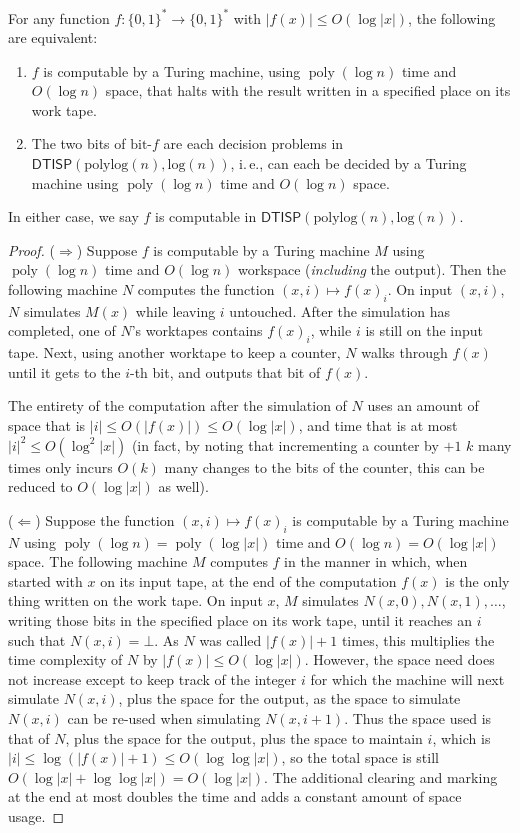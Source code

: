 \documentclass{article}
\DeclareMathOperator{\poly}{poly}
\newcommand*{\ComplexityClass}[1]{\ensuremath{\mathsf{#1}}\xspace}
\newcommand{\DTISP}{\ComplexityClass{DTISP}}
\newcommand{\DTISPpll}{\ensuremath{\DTISP(\mathrm{polylog}(n),\mathrm{log}(n))}\xspace}
\begin{document}
\begin{deflem} \label{def:DTISP}
For any function $f \colon \{0,1\}^* \to \{0,1\}^*$ with $|f(x)| \leq O(\log |x|)$, the following are equivalent:
\begin{enumerate}
\item $f$ is computable by a Turing machine, using $\poly(\log n)$ time and $O(\log n)$ space, that halts with the result written in a specified place on its work tape.

\item The two bits of $\text{bit-}f$ are each decision problems in $\DTISPpll$, i.\,e., can each be decided by a Turing machine using $\poly(\log n)$ time and $O(\log n)$ space. 
\end{enumerate}
In either case, we say $f$ is computable in $\DTISPpll$.
\end{deflem}

\begin{proof}
($\Rightarrow$) Suppose $f$ is computable by a Turing machine $M$ using $\poly(\log n)$ time and $O(\log n)$ workspace (\emph{including} the output). Then the following machine $N$ computes the function $(x,i) \mapsto f(x)_i$. On input $(x,i)$, $N$ simulates $M(x)$ while leaving $i$ untouched. After the simulation has completed, one of $N$'s worktapes contains $f(x)_i$, while $i$ is still on the input tape. Next, using another worktape to keep a counter, $N$ walks through $f(x)$ until it gets to the $i$-th bit, and outputs that bit of $f(x)$. 

The entirety of the computation after the simulation of $N$ uses an amount of space that is $|i| \leq O(|f(x)|) \leq O(\log |x|)$, and time that is at most $|i|^2 \leq O(\log^2 |x|)$ (in fact, by noting that incrementing a counter by $+1$ $k$ many times only incurs $O(k)$ many changes to the bits of the counter, this can be reduced to $O(\log |x|)$ as well).

($\Leftarrow$) Suppose the function $(x,i) \mapsto f(x)_i$ is computable by a Turing machine $N$ using $\poly(\log n) = \poly(\log |x|)$ time and $O(\log n) = O(\log |x|)$ space. The following machine $M$ computes $f$ in the manner in which, when started with $x$ on its input tape, at the end of the computation $f(x)$ is the only thing written on the work tape. On input $x$, $M$ simulates $N(x,0), N(x,1), \dotsc$, writing those bits in the specified place on its work tape, until it reaches an $i$ such that $N(x,i) = \bot$. As $N$ was called $|f(x)|+1$ times, this multiplies the time complexity of $N$ by $|f(x)| \leq O(\log |x|)$. However, the space need does not increase except to keep track of the integer $i$ for which the machine will next simulate $N(x,i)$, plus the space for the output, as the space to simulate $N(x,i)$ can be re-used when simulating $N(x,i+1)$. Thus the space used is that of $N$, plus the space for the output, plus the space to maintain $i$, which is $|i| \leq \log (|f(x)|+1) \leq O(\log \log |x|)$, so the total space is still $O(\log |x| + \log \log|x|) = O(\log |x|)$. The additional clearing and marking at the end at most doubles the time and adds a constant amount of space usage.
\end{proof}
\end{document}
